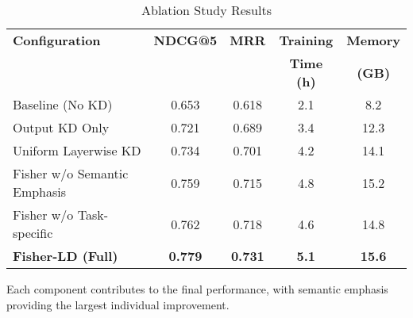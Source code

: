 \begin{table}[!t]
\centering
\caption{Ablation Study Results}
\label{tab:ablation}
\begin{tabular}{l|c|c|c|c}
\hline
\textbf{Configuration} & \textbf{NDCG@5} & \textbf{MRR} & \textbf{Training} & \textbf{Memory} \\
& & & \textbf{Time (h)} & \textbf{(GB)} \\
\hline
Baseline (No KD) & 0.653 & 0.618 & 2.1 & 8.2 \\
Output KD Only & 0.721 & 0.689 & 3.4 & 12.3 \\
Uniform Layerwise KD & 0.734 & 0.701 & 4.2 & 14.1 \\
Fisher w/o Semantic Emphasis & 0.759 & 0.715 & 4.8 & 15.2 \\
Fisher w/o Task-specific & 0.762 & 0.718 & 4.6 & 14.8 \\
\hline
\textbf{Fisher-LD (Full)} & \textbf{0.779} & \textbf{0.731} & \textbf{5.1} & \textbf{15.6} \\
\hline
\end{tabular}
\vspace{-2mm}
\footnotesize{Each component contributes to the final performance, with semantic emphasis providing the largest individual improvement.}
\end{table}

